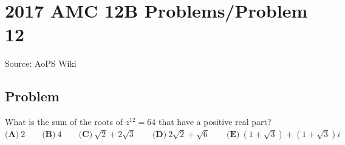 \documentclass[12pt]{article}
\begin{document}
\section*{{2017 AMC 12B Problems/Problem 12}}
Source: AoPS Wiki

\subsection*{Problem}
What is the sum of the roots of $z^{12}=64$ that have a positive real part? $\textbf{(A)}\ 2 \qquad \textbf{(B)}\ 4 \qquad \textbf{(C)}\ \sqrt{2}+2\sqrt{3} \qquad \textbf{(D)}\ 2\sqrt{2}+\sqrt{6} \qquad \textbf{(E)}\ (1+\sqrt{3}) + (1+\sqrt{3})i$
\end{document}
